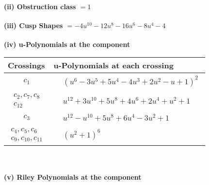 \documentclass[1p]{elsarticle_modified}
\theoremstyle{definition}
\begin{document}
\flushleft \textbf{(ii) Obstruction class $= 1$}\\~\\
\flushleft \textbf{(iii) Cusp Shapes $= -4 u^{10}-12 u^8-16 u^6-8 u^4-4$}\\~\\
\newpage\renewcommand{\arraystretch}{1}
\flushleft \textbf{(iv) u-Polynomials at the component}\newline \\
\begin{tabular}{m{50pt}|m{274pt}}
Crossings & \hspace{64pt}u-Polynomials at each crossing \\
\hline $$\begin{aligned}c_{1}\end{aligned}$$&$\begin{aligned}
&(u^6-3 u^5+5 u^4-4 u^3+2 u^2- u+1)^2
\end{aligned}$\\
\hline $$\begin{aligned}c_{2},c_{7},c_{8}\\c_{12}\end{aligned}$$&$\begin{aligned}
&u^{12}+3 u^{10}+5 u^8+4 u^6+2 u^4+u^2+1
\end{aligned}$\\
\hline $$\begin{aligned}c_{3}\end{aligned}$$&$\begin{aligned}
&u^{12}- u^{10}+5 u^8+6 u^4-3 u^2+1
\end{aligned}$\\
\hline $$\begin{aligned}c_{4},c_{5},c_{6}\\c_{9},c_{10},c_{11}\end{aligned}$$&$\begin{aligned}
&(u^2+1)^6
\end{aligned}$\\
\hline
\end{tabular}\\~\\
\newpage\renewcommand{\arraystretch}{1}
\flushleft \textbf{(v) Riley Polynomials at the component}\newline \\
\end{document}
